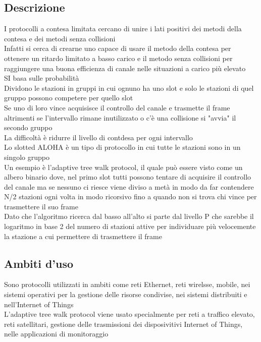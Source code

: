 \documentclass[10pt,oneside,a4paper]{article}
\begin{document}
\subsection{Descrizione}
I protocolli a contesa limitata cercano di unire i lati positivi dei metodi della contesa e dei metodi senza collisioni\\
Infatti si cerca di crearne uno capace di usare il metodo della contesa per ottenere un ritardo limitato a basso carico e il metodo senza collisioni per raggiungere una buona efficienza di canale nelle situazioni a carico più elevato\\
SI basa sulle probabilità\\
Dividono le stazioni in gruppi in cui ognuno ha uno slot e solo le stazioni di quel gruppo possono competere per quello slot\\
Se uno di loro vince acquisisce il controllo del canale e trasmette il frame altrimenti se l'intervallo rimane inutilizzato o c'è una collisione si "avvia" il secondo gruppo\\
La difficoltà è ridurre il livello di contdesa per ogni intervallo\\
Lo slotted ALOHA è un tipo di protocollo in cui tutte le stazioni sono in un singolo gruppo\\
Un esempio è l'adaptive tree walk protocol, il quale può essere visto come un albero binario dove, nel primo slot tutti possono tentare di acquisire il controllo del canale ma se nessuno ci riesce viene diviso a metà in modo da far contendere N/2 stazioni ogni volta in modo ricorsivo fino a quando non si trova chi vince per trasmettere il suo frame\\
Dato che l'algoritmo ricerca dal basso all'alto si parte dal livello P che sarebbe il logaritmo in base 2 del numero di stazioni attive per individuare più velocemente la stazione a cui permettere di trasmettere il frame
\subsection{Ambiti d'uso}
Sono protocolli utilizzati in ambiti come reti Ethernet, reti wirelsse, mobile, nei sistemi operativi per la gestione delle risorse condivise, nei sistemi distribuiti e nell'Internet of Things\\
L'adaptive tree walk protocol viene usato specialmente per reti a traffico elevato, reti satellitari, gestione delle trasmissioni dei disposivitivi Internet of Things, nelle applicazioni di monitoraggio
\end{document}
